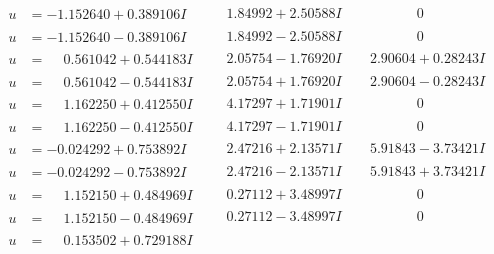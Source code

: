 \documentclass[1p]{elsarticle_modified}
\theoremstyle{definition}
\begin{document}
$$\begin{array}{c|c|c}
\begin{aligned}
u &= -1.152640 + 0.389106 I\end{aligned}
 & \phantom{-}1.84992 + 2.50588 I & \phantom{-0.000000 } 0 \\ \hline\begin{aligned}
u &= -1.152640 - 0.389106 I\end{aligned}
 & \phantom{-}1.84992 - 2.50588 I & \phantom{-0.000000 } 0 \\ \hline\begin{aligned}
u &= \phantom{-}0.561042 + 0.544183 I\end{aligned}
 & \phantom{-}2.05754 - 1.76920 I & \phantom{-}2.90604 + 0.28243 I \\ \hline\begin{aligned}
u &= \phantom{-}0.561042 - 0.544183 I\end{aligned}
 & \phantom{-}2.05754 + 1.76920 I & \phantom{-}2.90604 - 0.28243 I \\ \hline\begin{aligned}
u &= \phantom{-}1.162250 + 0.412550 I\end{aligned}
 & \phantom{-}4.17297 + 1.71901 I & \phantom{-0.000000 } 0 \\ \hline\begin{aligned}
u &= \phantom{-}1.162250 - 0.412550 I\end{aligned}
 & \phantom{-}4.17297 - 1.71901 I & \phantom{-0.000000 } 0 \\ \hline\begin{aligned}
u &= -0.024292 + 0.753892 I\end{aligned}
 & \phantom{-}2.47216 + 2.13571 I & \phantom{-}5.91843 - 3.73421 I \\ \hline\begin{aligned}
u &= -0.024292 - 0.753892 I\end{aligned}
 & \phantom{-}2.47216 - 2.13571 I & \phantom{-}5.91843 + 3.73421 I \\ \hline\begin{aligned}
u &= \phantom{-}1.152150 + 0.484969 I\end{aligned}
 & \phantom{-}0.27112 + 3.48997 I & \phantom{-0.000000 } 0 \\ \hline\begin{aligned}
u &= \phantom{-}1.152150 - 0.484969 I\end{aligned}
 & \phantom{-}0.27112 - 3.48997 I & \phantom{-0.000000 } 0 \\ \hline\begin{aligned}
u &= \phantom{-}0.153502 + 0.729188 I\end{aligned}

\end{array}$$
\end{document}
